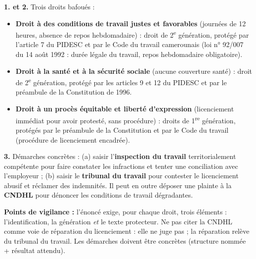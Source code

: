 \documentclass[11pt]{article}
\begin{document}
\begin{corrige}
\textbf{1. et 2.} Trois droits bafoués :
\begin{itemize}
\item \textbf{Droit à des conditions de travail justes et favorables} (journées de 12 heures, absence de repos hebdomadaire) : droit de 2\textsuperscript{e} génération, protégé par l'article 7 du PIDESC et par le Code du travail camerounais (loi n° 92/007 du 14 août 1992 : durée légale du travail, repos hebdomadaire obligatoire).
\item \textbf{Droit à la santé et à la sécurité sociale} (aucune couverture santé) : droit de 2\textsuperscript{e} génération, protégé par les articles 9 et 12 du PIDESC et par le préambule de la Constitution de 1996.
\item \textbf{Droit à un procès équitable et liberté d'expression} (licenciement immédiat pour avoir protesté, sans procédure) : droits de 1\textsuperscript{re} génération, protégés par le préambule de la Constitution et par le Code du travail (procédure de licenciement encadrée).
\end{itemize}

\textbf{3.} Démarches concrètes : (a) saisir l'\textbf{inspection du travail} territorialement compétente pour faire constater les infractions et tenter une conciliation avec l'employeur ; (b) saisir le \textbf{tribunal du travail} pour contester le licenciement abusif et réclamer des indemnités. Il peut en outre déposer une plainte à la \textbf{CNDHL} pour dénoncer les conditions de travail dégradantes.

\textbf{Points de vigilance :} l'énoncé exige, pour chaque droit, trois éléments : l'identification, la génération \emph{et} le texte protecteur. Ne pas citer la CNDHL comme voie de réparation du licenciement : elle ne juge pas ; la réparation relève du tribunal du travail. Les démarches doivent être concrètes (structure nommée + résultat attendu).
\end{corrige}
\end{document}
